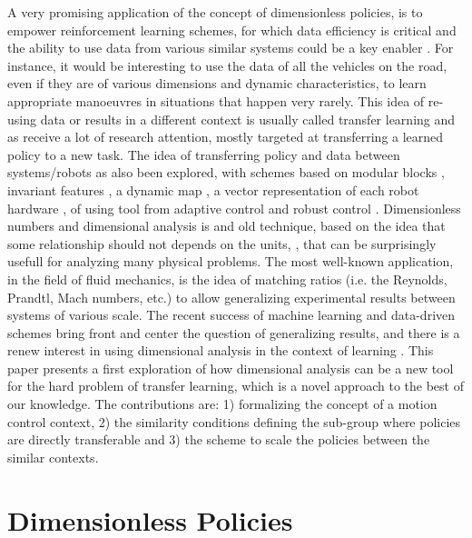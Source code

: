 A very promising application of the concept of dimensionless policies, is to empower reinforcement learning schemes, for which data efficiency is critical and the ability to use data from various similar systems could be a key enabler \cite{sutton_reinforcement_2018}. For instance, it would be interesting to use the data of all the vehicles on the road, even if they are of various dimensions and dynamic characteristics, to learn appropriate manoeuvres in situations that happen very rarely. This idea of re-using data or results in a different context is usually called transfer learning \cite{taylor_transfer_2009} and as receive a lot of research attention, mostly targeted at transferring a learned policy to a new task. The idea of transferring policy and data between systems/robots as also been explored, with schemes based on modular blocks \cite{devin_learning_2017}, invariant features \cite{gupta_learning_2017}, a dynamic map \cite{helwa_multi-robot_2017}, a vector representation of each robot hardware \cite{chen_hardware_2018}, of using tool from adaptive control \cite{pereida_data-efficient_2018} and robust control \cite{sorocky_experience_2020}. Dimensionless numbers and dimensional analysis is and old technique, based on the idea that some relationship should not depends on the units, \cite{bertrand_sur_1878} \cite{rayleigh_viii_1892} \cite{buckingham_physically_1914}, that can be surprisingly usefull for analyzing many physical problems. The most well-known application, in the field of fluid mechanics, is the idea of matching ratios (i.e. the Reynolds, Prandtl, Mach numbers, etc.) to allow generalizing experimental results between systems of various scale. The recent success of machine learning and data-driven schemes bring front and center the question of generalizing results, and there is a renew interest in using dimensional analysis in the context of learning \cite{bakarji_dimensionally_2022} \cite{fukami_robust_2021} \cite{xie_data-driven_2022}. This paper presents a first exploration of how dimensional analysis can be a new tool for the hard problem of transfer learning, which is a novel approach to the best of our knowledge. The contributions are: 1) formalizing the concept of a motion control context, 2) the similarity conditions defining the sub-group where policies are directly transferable and 3) the scheme to scale the policies between the similar contexts.

\section{Dimensionless Policies}
\label{sec:dimenanalysis}

